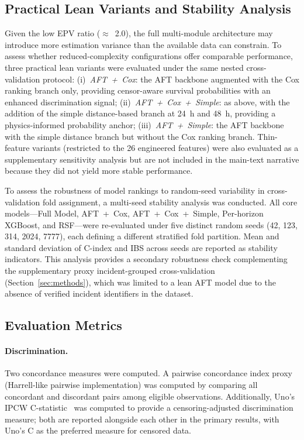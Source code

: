 \documentclass[fire,article,submit,pdftex]{../Definitions/mdpi}
\begin{document}
\subsection{Practical Lean Variants and Stability Analysis}\label{sec:lean_variants}

Given the low EPV ratio ($\approx$~2.0), the full multi-module architecture may introduce more estimation variance than the available data can constrain.
To assess whether reduced-complexity configurations offer comparable performance, three practical lean variants were evaluated under the same nested cross-validation protocol:
(i)~\emph{AFT~+~Cox}: the AFT backbone augmented with the Cox ranking branch only, providing censor-aware survival probabilities with an enhanced discrimination signal;
(ii)~\emph{AFT~+~Cox~+~Simple}: as above, with the addition of the simple distance-based branch at 24~h and 48~h, providing a physics-informed probability anchor;
(iii)~\emph{AFT~+~Simple}: the AFT backbone with the simple distance branch but without the Cox ranking branch.
Thin-feature variants (restricted to the 26 engineered features) were also evaluated as a supplementary sensitivity analysis but are not included in the main-text narrative because they did not yield more stable performance.

To assess the robustness of model rankings to random-seed variability in cross-validation fold assignment, a multi-seed stability analysis was conducted.
All core models---Full Model, AFT~+~Cox, AFT~+~Cox~+~Simple, Per-horizon XGBoost, and RSF---were re-evaluated under five distinct random seeds (42, 123, 314, 2024, 7777), each defining a different stratified fold partition.
Mean and standard deviation of C-index and IBS across seeds are reported as stability indicators.
This analysis provides a secondary robustness check complementing the supplementary proxy incident-grouped cross-validation (Section~\ref{sec:methods}), which was limited to a lean AFT model due to the absence of verified incident identifiers in the dataset.

\subsection{Evaluation Metrics}\label{sec:metrics}

\paragraph{Discrimination.}
Two concordance measures were computed.
A pairwise concordance index proxy~\cite{Harrell1996} (Harrell-like pairwise implementation) was computed by comparing all concordant and discordant pairs among eligible observations.
Additionally, Uno's IPCW C-statistic~\cite{Uno2011} was computed to provide a censoring-adjusted discrimination measure; both are reported alongside each other in the primary results, with Uno's C as the preferred measure for censored data.
\end{document}

